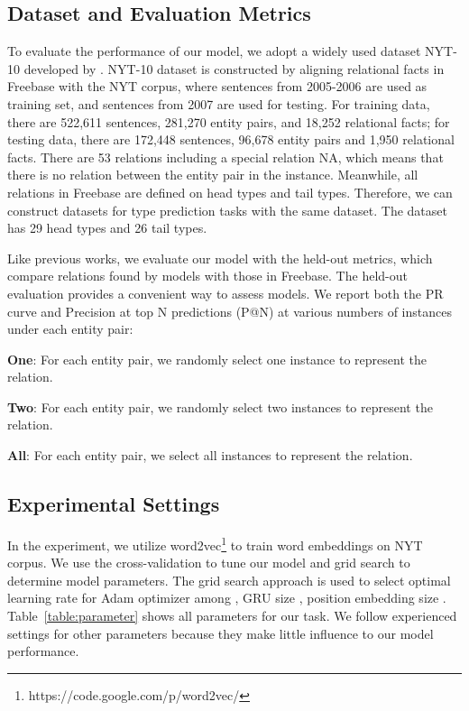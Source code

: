 \documentclass[11pt,a4paper]{article}
\begin{document}
  \subsection{Dataset and Evaluation Metrics}
  To evaluate the performance of our model, we adopt a widely used dataset NYT-10 developed by \citet{riedel2010modeling}. NYT-10 dataset is constructed by aligning relational facts in Freebase \citep{bollacker2008freebase} with the NYT corpus, where sentences from 2005-2006 are used as training set, and sentences from 2007 are used for testing. For training data, there are 522,611 sentences, 281,270 entity pairs, and 18,252 relational facts; for testing data, there are 172,448 sentences, 96,678 entity pairs and 1,950 relational facts. There are 53 relations including a special relation NA, which means that there is no relation between the entity pair in the instance. Meanwhile, all relations in Freebase are defined on head types and tail types. Therefore, we can construct datasets for type prediction tasks with the same dataset. The dataset has 29 head types and 26 tail types.

  Like previous works, we evaluate our model with the held-out metrics, which compare relations found by models with those in Freebase. The held-out evaluation provides a convenient way to assess models. We report both the PR curve and Precision at top N predictions (P@N) at various numbers of instances under each entity pair:
  
  \textbf{One}: For each entity pair, we randomly select one instance to represent the relation.
  
  \textbf{Two}: For each entity pair, we randomly select two instances to represent the relation.

  \textbf{All}: For each entity pair, we select all instances to represent the relation.

  \subsection{Experimental Settings}
  In the experiment, we utilize word2vec\footnote{https://code.google.com/p/word2vec/} to train word embeddings on NYT corpus. We use the cross-validation to tune our model and grid search to determine model parameters. The grid search approach is used to select optimal learning rate  for Adam optimizer among , GRU size , position embedding size . Table~\ref{table:parameter} shows all parameters for our task. We follow experienced settings for other parameters because they make little influence to our model performance.
\end{document}
